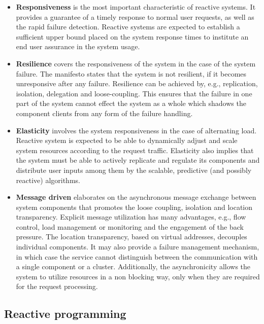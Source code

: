 \documentclass[oneside,
  digital, %
  table,   %
  lof,     %
  lot,     %
]{fithesis3}
\begin{document}
\begin{itemize}
    \item \textbf{Responsiveness} is the most important characteristic of reactive systems. It provides a guarantee of a timely response to normal user requests, as well as the rapid failure detection. Reactive systems are expected to establish a sufficient upper bound placed on the system response times to institute an end user assurance in the system usage.
    
    \item \textbf{Resilience} covers the responsiveness of the system in the case of the system failure. The manifesto states that the system is not resilient, if it becomes unresponsive after any failure. Resilience can be achieved by, e.g., replication, isolation, delegation and loose-coupling. This ensures that the failure in one part of the system cannot effect the system as a whole which shadows the component clients from any form of the failure handling.
    
    \item \textbf{Elasticity} involves the system responsiveness in the case of alternating load. Reactive system is expected to be able to dynamically adjust and scale system resources according to the request traffic. Elasticity also implies that the system must be able to actively replicate and regulate its components and distribute user inputs among them by the scalable, predictive (and possibly reactive) algorithms.
    
    \item \textbf{Message driven} elaborates on the asynchronous message exchange between system components that promotes the loose coupling, isolation and location transparency. Explicit message utilization has many advantages, e.g., flow control, load management or monitoring and the engagement of the back pressure. The location transparency, based on virtual addresses, decouples individual components. It may also provide a failure management mechanism, in which case the service cannot distinguish between the communication with a single component or a cluster. Additionally, the asynchronicity allows the system to utilize resources in a non blocking way, only when they are required for the request processing. 
\end{itemize}

\subsection{Reactive programming}
\end{document}
